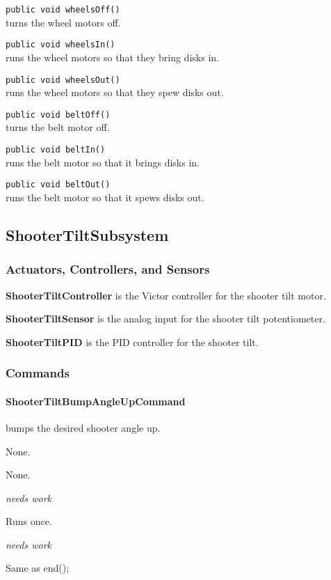 \documentclass[]{article}
\begin{document}
\noindent
\lstinline[]|public void wheelsOff()| \\
turns the wheel motors off.

\noindent
\lstinline[]|public void wheelsIn()| \\
runs the wheel motors so that they bring disks in.

\noindent
\lstinline[]|public void wheelsOut()| \\
runs the wheel motors so that they spew disks out.

\noindent
\lstinline[]|public void beltOff()| \\
turns the belt motor off.

\noindent
\lstinline[]|public void beltIn()| \\
runs the belt motor so that it brings disks in.

\noindent
\lstinline[]|public void beltOut()| \\
runs the belt motor so that it spews disks out.

\subsection{ShooterTiltSubsystem}

\subsubsection{Actuators, Controllers, and Sensors}

\textbf{ShooterTiltController} is the Victor controller for the shooter tilt motor.

\textbf{ShooterTiltSensor} is the analog input for the shooter tilt potentiometer.

\textbf{ShooterTiltPID} is the PID controller for the shooter tilt.

\subsubsection{Commands}

\paragraph{ShooterTiltBumpAngleUpCommand} bumps the desired shooter angle up.
\begin{description}[topsep=0ex]
\item[requires] None.
\item[initialization] None.
\item[execute] \emph{needs work}
\item[isDone] Runs once.
\item[end] \emph{needs work}
\item[interrupted] Same as end();
\end{description}
\end{document}
